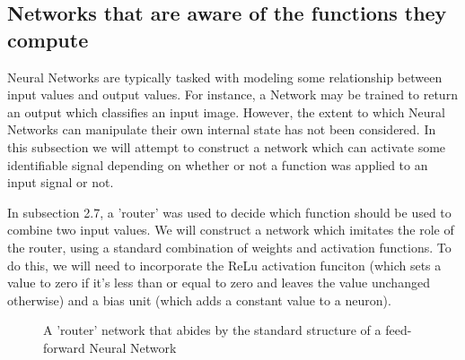 \documentclass{article}
\begin{document}
	
	\subsection{Networks that are aware of the functions they compute}
	
		Neural Networks are typically tasked with modeling some relationship between input values and output values. For instance, a Network may be trained to return an output which classifies an input image. However, the extent to which Neural Networks can manipulate their own internal state has not been considered. In this subsection we will attempt to construct a network which can activate some identifiable signal depending on whether or not a function was applied to an input signal or not. 
		
		In subsection 2.7, a 'router' was used to decide which function should be used to combine two input values. We will construct a network which imitates the role of the router, using a standard combination of weights and activation functions. To do this, we will need to incorporate the ReLu activation funciton (which sets a value to zero if it's less than or equal to zero and leaves the value unchanged otherwise) and a bias unit (which adds a constant value to a neuron). 
		
		\newpage
		\begin{figure}
			
			\centering
			
			\caption{A 'router' network that abides by the standard structure of a feed-forward Neural Network}
			
		\end{figure}
		
\end{document}
